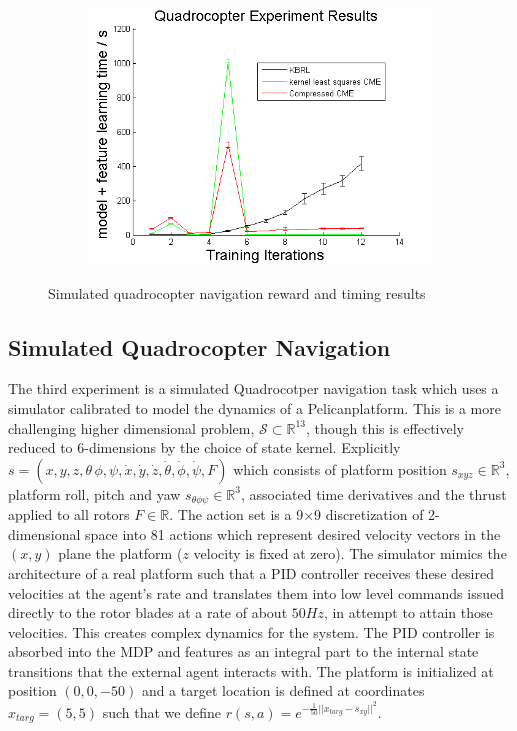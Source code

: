 \documentclass[letterpaper]{article}
\newcommand{\cS}{{\mathcal S}}
\newcommand{\R}{{\mathbb R}}
\begin{document}
\begin{figure}[htb]
\begin{subfigure}[b]{0.3\textwidth}
\includegraphics[clip, width=\textwidth]{Quadmodelfeature.png}
\end{subfigure}
\caption{Simulated quadrocopter navigation reward and timing results}
  \label{Quadfigs}
\end{figure}

\subsection{Simulated Quadrocopter Navigation}

The third experiment is a simulated Quadrocotper navigation task which uses a simulator \citep{denardi2013rn} calibrated to model the dynamics of a Pelican\texttrademark  platform. This is a more challenging higher dimensional problem, $\cS\subset\R^{13}$, though this is effectively reduced to 6-dimensions by the choice of state kernel. Explicitly $s=(x,y,z,\theta\,\phi,\psi,\dot{x},\dot{y},\dot{z},\dot{\theta},\dot{\phi},\dot{\psi},F)$ which consists of platform position $s_{xyz}\in\R^3$, platform roll, pitch and yaw $s_{\theta\phi\psi}\in\R^3$, associated time derivatives and the thrust applied to all rotors $F\in\R$. The action set is a 9$\times$9 discretization of 2-dimensional space into 81 actions which represent desired velocity vectors in the $(x,y)$ plane the platform ($z$ velocity is fixed at zero). The simulator mimics the architecture of a real platform such that a PID controller receives these desired velocities at the agent's rate and translates them into low level commands issued directly to the rotor blades at a rate of about $50Hz$, in attempt to attain those velocities. This creates complex dynamics for the system. The PID controller is absorbed into the MDP and features as an integral part to the internal state transitions that the external agent interacts with. The platform is initialized at position $(0,0,-50)$ and a target location is defined at coordinates $x_{targ} = (5,5)$ such that we define $r(s,a)=e^{-\frac{1}{50}||x_{targ}-s_{xy}||^{2}}$.
\end{document}
